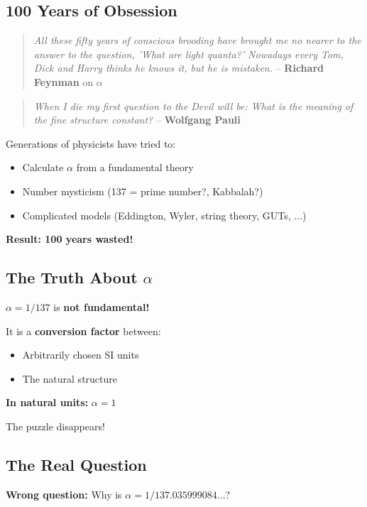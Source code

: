 \subsection{100 Years of Obsession}

\begin{quote}
	\textit{All these fifty years of conscious brooding have brought me no nearer to the answer to the question, 'What are light quanta?' Nowadays every Tom, Dick and Harry thinks he knows it, but he is mistaken.} -- \textbf{Richard Feynman} on $\alpha$
\end{quote}

\begin{quote}
	\textit{When I die my first question to the Devil will be: What is the meaning of the fine structure constant?} -- \textbf{Wolfgang Pauli}
\end{quote}

Generations of physicists have tried to:
\begin{itemize}[nosep]
	\item Calculate $\alpha$ from a fundamental theory
	\item Number mysticism (137 = prime number?, Kabbalah?)
	\item Complicated models (Eddington, Wyler, string theory, GUTs, ...)
\end{itemize}

\textbf{Result: 100 years wasted!}

\subsection{The Truth About $\alpha$}

$\alpha = 1/137$ is \textbf{not fundamental!}

It is a \textbf{conversion factor} between:
\begin{itemize}[nosep]
	\item Arbitrarily chosen SI units
	\item The natural structure
\end{itemize}

\textbf{In natural units:} $\alpha = 1$

The puzzle disappears!

\subsection{The Real Question}

\textbf{Wrong question:} Why is $\alpha = 1/137.035999084...$?


